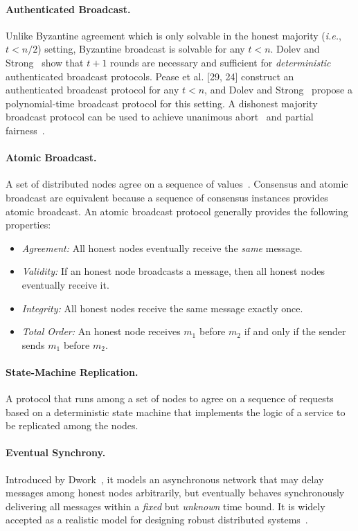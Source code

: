 \documentclass[11pt]{article}
\newcommand{\ie}{\textit{i.e.}}
\theoremstyle{mytheoremstyle}
\begin{document}
\paragraph{Authenticated Broadcast.} Unlike Byzantine agreement which is only solvable in the honest majority (\ie, $t<n/2$) setting, Byzantine broadcast is solvable for any $t < n$. Dolev and Strong~\cite{Dolev:Strong:83} show that $t + 1$ rounds are necessary and sufficient for \emph{deterministic} authenticated broadcast protocols. Pease et al. [29, 24] construct an authenticated broadcast protocol for any $t < n$, and Dolev and Strong~\cite{Dolev:Strong:83} propose a polynomial-time broadcast protocol for this setting. A dishonest majority broadcast protocol can be used to achieve unanimous abort~\cite{goldwasser:2002:mpcnoba} and partial fairness~\cite{gradwohl:2006}.

\paragraph{Atomic Broadcast.}
A set of distributed nodes agree on a sequence of values~\cite{AtomicBroadcast:1993}. Consensus and atomic broadcast are equivalent because a sequence of consensus instances provides atomic broadcast. An atomic broadcast protocol generally provides the following properties:
\begin{itemize}
	\item \textit{Agreement:} All honest nodes eventually receive the \emph{same} message.
	\item \textit{Validity:} If an honest node broadcasts a message, then all honest nodes eventually receive it.
	\item \textit{Integrity:} All honest nodes receive the same message exactly once.
	\item \textit{Total Order:} An honest node receives $m_1$ before $m_2$ if and only if the sender sends $m_1$ before $m_2$.
\end{itemize}

\paragraph{State-Machine Replication.}
A protocol that runs among a set of nodes to agree on a sequence of requests based on a deterministic state machine that implements the logic of a service to be replicated among the nodes.

\paragraph{Eventual Synchrony.} Introduced by Dwork~\cite{dwork:1988:cpp}, it models an asynchronous network that may delay messages among honest nodes arbitrarily, but eventually behaves synchronously delivering all messages within a \emph{fixed} but \emph{unknown} time bound. It is widely accepted as a realistic model for designing robust distributed systems~\cite{DBLP:journals/corr/CachinV17}.
\end{document}
